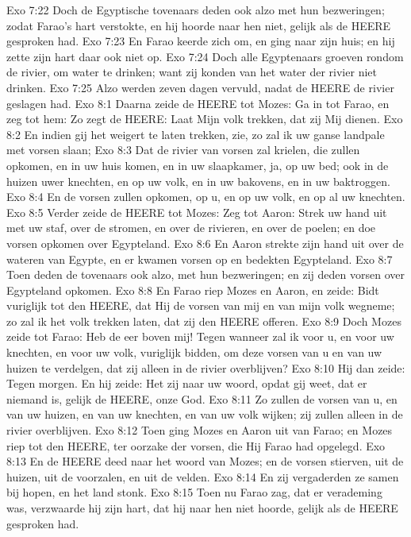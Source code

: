 Exo 7:22  Doch de Egyptische tovenaars deden ook alzo met hun bezweringen; zodat Farao's hart verstokte, en hij hoorde naar hen niet, gelijk als de HEERE gesproken had.
Exo 7:23  En Farao keerde zich om, en ging naar zijn huis; en hij zette zijn hart daar ook niet op.
Exo 7:24  Doch alle Egyptenaars groeven rondom de rivier, om water te drinken; want zij konden van het water der rivier niet drinken.
Exo 7:25  Alzo werden zeven dagen vervuld, nadat de HEERE de rivier geslagen had.
Exo 8:1  Daarna zeide de HEERE tot Mozes: Ga in tot Farao, en zeg tot hem: Zo zegt de HEERE: Laat Mijn volk trekken, dat zij Mij dienen.
Exo 8:2  En indien gij het weigert te laten trekken, zie, zo zal ik uw ganse landpale met vorsen slaan;
Exo 8:3  Dat de rivier van vorsen zal krielen, die zullen opkomen, en in uw huis komen, en in uw slaapkamer, ja, op uw bed; ook in de huizen uwer knechten, en op uw volk, en in uw bakovens, en in uw baktroggen.
Exo 8:4  En de vorsen zullen opkomen, op u, en op uw volk, en op al uw knechten.
Exo 8:5  Verder zeide de HEERE tot Mozes: Zeg tot Aaron: Strek uw hand uit met uw staf, over de stromen, en over de rivieren, en over de poelen; en doe vorsen opkomen over Egypteland.
Exo 8:6  En Aaron strekte zijn hand uit over de wateren van Egypte, en er kwamen vorsen op en bedekten Egypteland.
Exo 8:7  Toen deden de tovenaars ook alzo, met hun bezweringen; en zij deden vorsen over Egypteland opkomen.
Exo 8:8  En Farao riep Mozes en Aaron, en zeide: Bidt vuriglijk tot den HEERE, dat Hij de vorsen van mij en van mijn volk wegneme; zo zal ik het volk trekken laten, dat zij den HEERE offeren.
Exo 8:9  Doch Mozes zeide tot Farao: Heb de eer boven mij! Tegen wanneer zal ik voor u, en voor uw knechten, en voor uw volk, vuriglijk bidden, om deze vorsen van u en van uw huizen te verdelgen, dat zij alleen in de rivier overblijven?
Exo 8:10  Hij dan zeide: Tegen morgen. En hij zeide: Het zij naar uw woord, opdat gij weet, dat er niemand is, gelijk de HEERE, onze God.
Exo 8:11  Zo zullen de vorsen van u, en van uw huizen, en van uw knechten, en van uw volk wijken; zij zullen alleen in de rivier overblijven.
Exo 8:12  Toen ging Mozes en Aaron uit van Farao; en Mozes riep tot den HEERE, ter oorzake der vorsen, die Hij Farao had opgelegd.
Exo 8:13  En de HEERE deed naar het woord van Mozes; en de vorsen stierven, uit de huizen, uit de voorzalen, en uit de velden.
Exo 8:14  En zij vergaderden ze samen bij hopen, en het land stonk.
Exo 8:15  Toen nu Farao zag, dat er verademing was, verzwaarde hij zijn hart, dat hij naar hen niet hoorde, gelijk als de HEERE gesproken had.
